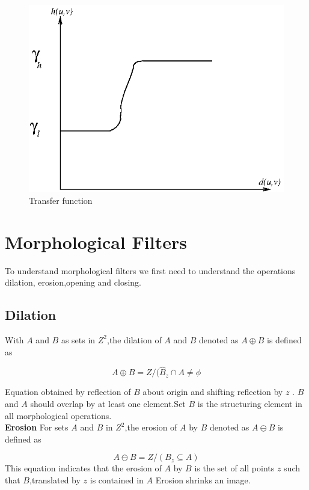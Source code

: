 \begin{figure}[htbp]
\centering
\includegraphics{graph.eps}
\caption{Transfer function}
\label{fig:graph}
\end{figure}

\section{Morphological Filters}

To understand morphological filters we first need to understand the operations dilation, erosion,opening  and  closing.

\subsection{Dilation}
With $A$ and $B$ as sets in $Z^{2}$,the dilation of $A$ and $B$ denoted as $A\oplus B$ is defined as

\[A\oplus B={Z/(\hat{B}_{z}\cap A \neq \phi}\]

Equation obtained by reflection of $B$ about origin and shifting reflection by $ z$ .
$B$  and $A$ should overlap by at least one element.Set $B$ is the structuring element in all morphological operations.\\
 \textbf{Erosion} For sets $A$ and $B$ in $Z^{2}$,the erosion of $A$ by $B$ denoted as $A\ominus B$ is defined as

\[ A\ominus B={Z/(B_{z}\subseteq A )} \]
This equation indicates that the erosion of $A$ by $B$ is the set of all points $z$ such that $B$,translated by $z$ is contained in $A$ Erosion shrinks an image.

